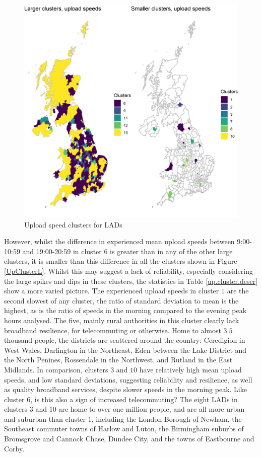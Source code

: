 \documentclass[]{interact}
\theoremstyle{plain}%
\theoremstyle{definition}
\theoremstyle{remark}
\begin{document}
\begin{figure}
\includegraphics[width=0.95\linewidth]{figures/map.up.clusters} \caption{\label{map.up.clusters}Upload speed clusters for LADs}\label{fig:unnamed-chunk-5}
\end{figure}

However, whilst the difference in experienced mean upload speeds between
9:00-10:59 and 19:00-20:59 in cluster \(6\) is greater than in any of
the other large clusters, it is smaller than this difference in all the
clusters shown in Figure \ref{UpClusterL}. Whilst this may suggest a
lack of reliability, especially considering the large spikes and dips in
these clusters, the statistics in Table \ref{up.cluster.descr} show a
more varied picture. The experienced upload speeds in cluster \(1\) are
the second slowest of any cluster, the ratio of standard deviation to
mean is the highest, as is the ratio of speeds in the morning compared
to the evening peak hours analysed. The five, mainly rural authorities
in this cluster clearly lack broadband resilience, for telecommuting or
otherwise. Home to almost \(3.5\) thousand people, the districts are
scattered around the country: Ceredigion in West Wales, Darlington in
the Northeast, Eden between the Lake District and the North Penines,
Rossendale in the Northwest, and Rutland in the East Midlands. In
comparison, clusters \(3\) and \(10\) have relatively high mean upload
speeds, and low standard deviations, suggesting reliability and
resilience, as well as quality broadband services, despite slower speeds
in the morning peak. Like cluster \(6\), is this also a sign of
increased telecommuting? The eight LADs in clusters \(3\) and \(10\) are
home to over one million people, and are all more urban and suburban
than cluster \(1\), including the London Borough of Newham, the
Southeast commuter towns of Harlow and Luton, the Birmingham suburbs of
Bromsgrove and Cannock Chase, Dundee City, and the towns of Eastbourne
and Corby.
\end{document}
